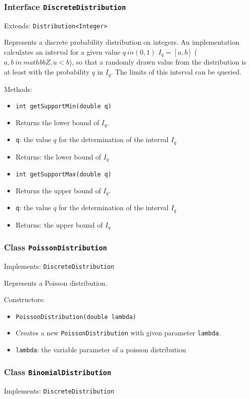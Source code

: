 \documentclass[parskip=full,11pt]{scrartcl}
\begin{document}
\subsubsection{Interface \texttt{DiscreteDistribution}}
Extends: \texttt{Distribution<Integer>}

Represents a discrete probability distribution on integers. An implementation calculates an interval for a given value \(q \ in (0,1) \) \(I_q = [a, b] \) (\(a, b \ in \ mathbb {Z}, a < b \)), so that a randomly drawn value from the distribution is at least with the probability \(q \) in \(I_q \). The limits of this interval can be queried.

Methods:
\begin{itemize}\itemsep -10pt
\item \texttt{int getSupportMin(double q)}
\item[] Returns the lower bound of \(I_q\).
\item[] \texttt{q}: the value \(q\) for the determination of the interval \(I_q\)
\item[] Returns: the lower bound of \(I_q\)

\item \texttt{int getSupportMax(double q)}
\item[] Returns the upper bound of \(I_q\).
\item[] \texttt{q}: the value \(q\) for the determination of the interval \(I_q\)
\item[] Returns: the upper bound of \(I_q\)
\end{itemize}

\subsubsection{Class \texttt{PoissonDistribution}}
Implements: \texttt{DiscreteDistribution}

Represents a Poisson distribution.

Constructors:
\begin{itemize}\itemsep -10pt
\item \texttt{PoissonDistribution(double lambda)}
\item[] Creates a new \texttt{PoissonDistribution} with given parameter \texttt{lambda}.
\item[] \texttt{lambda}: the variable parameter of a poisson distribution
\end{itemize}

\subsubsection{Class \texttt{BinomialDistribution}}
Implements: \texttt{DiscreteDistribution}
\end{document}
